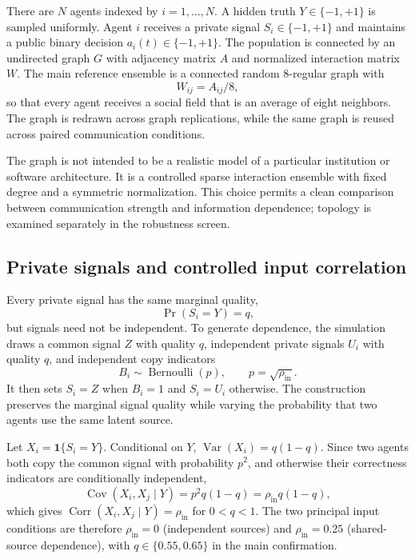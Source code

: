 \documentclass[11pt,a4paper]{article}
\begin{document}
There are $N$ agents indexed by $i=1,\ldots,N$. A hidden truth $Y\in\{-1,+1\}$ is sampled uniformly. Agent $i$ receives a private signal $S_i\in\{-1,+1\}$ and maintains a public binary decision $a_i(t)\in\{-1,+1\}$. The population is connected by an undirected graph $G$ with adjacency matrix $A$ and normalized interaction matrix $W$. The main reference ensemble is a connected random 8-regular graph with
\[
W_{ij}=A_{ij}/8,
\]
so that every agent receives a social field that is an average of eight neighbors. The graph is redrawn across graph replications, while the same graph is reused across paired communication conditions.

The graph is not intended to be a realistic model of a particular institution or software architecture. It is a controlled sparse interaction ensemble with fixed degree and a symmetric normalization. This choice permits a clean comparison between communication strength and information dependence; topology is examined separately in the robustness screen.

\subsection{Private signals and controlled input correlation}

Every private signal has the same marginal quality,
\[
\Pr(S_i=Y)=q,
\]
but signals need not be independent. To generate dependence, the simulation draws a common signal $Z$ with quality $q$, independent private signals $U_i$ with quality $q$, and independent copy indicators
\[
B_i\sim\operatorname{Bernoulli}(p),\qquad p=\sqrt{\rho_{\mathrm{in}}}.
\]
It then sets $S_i=Z$ when $B_i=1$ and $S_i=U_i$ otherwise. The construction preserves the marginal signal quality while varying the probability that two agents use the same latent source.

Let $X_i=\mathbf{1}\{S_i=Y\}$. Conditional on $Y$, $\operatorname{Var}(X_i)=q(1-q)$. Since two agents both copy the common signal with probability $p^2$, and otherwise their correctness indicators are conditionally independent,
\begin{equation}
\operatorname{Cov}(X_i,X_j\mid Y)=p^2q(1-q)=\rho_{\mathrm{in}}q(1-q),
\end{equation}
which gives $\operatorname{Corr}(X_i,X_j\mid Y)=\rho_{\mathrm{in}}$ for $0<q<1$. The two principal input conditions are therefore $\rho_{\mathrm{in}}=0$ (independent sources) and $\rho_{\mathrm{in}}=0.25$ (shared-source dependence), with $q\in\{0.55,0.65\}$ in the main confirmation.
\end{document}
